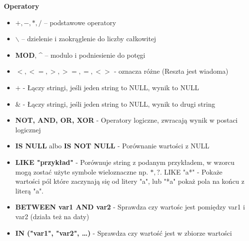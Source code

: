 \documentclass[12pt, a4paper]{article}
\begin{document}
\textbf{Operatory}
\begin{itemize}
  \item \textbf{$+, -, *, /$} – podstawowe operatory
  \item \textbf{$\backslash$} – dzielenie i zaokrąglenie do liczby całkowitej
  \item \textbf{MOD}, \^{} – modulo i podniesienie do potęgi
  \item \textbf{$<, <=, >, >=, =, <>$} - oznacza różne (Reszta jest wiadoma)
  \item \textbf{$+$} - Łączy stringi, jeśli jeden string to NULL, wynik to NULL
  \item \textbf{$\&$} - Łączy stringi, jeśli jeden string to NULL, wynik to drugi string
  \item \textbf{NOT, AND, OR, XOR} - Operatory logiczne, zwracają wynik w postaci logicznej
  \item \textbf{IS NULL} albo \textbf{IS NOT NULL} - Porównanie wartości z NULL
  \item \textbf{LIKE "przykład"} - Porównuje string z podanym przykładem, w wzorcu mogą zostać użyte symbole wieloznaczne np. $*, ?$.
    LIKE "a*" - Pokaże wartości pól które zaczynają się od litery "a", lub "*a" pokaż pola na końcu z literą "a".
  \item \textbf{BETWEEN var1 AND var2} - Sprawdza czy wartośc jest pomiędzy var1 i var2 (działa też na daty)
  \item \textbf{IN ("var1", "var2", \dots)} - Sprawdza czy wartość jest w zbiorze wartości
\end{itemize}
\end{document}
